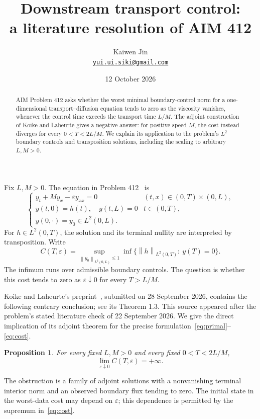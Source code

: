 \documentclass[11pt]{article}
\title{Downstream transport control:\\a literature resolution of AIM 412}
\author{Kaiwen Jin\\\small\href{mailto:yui.ui.siki@gmail.com}{\texttt{yui.ui.siki@gmail.com}}}
\date{12 October 2026}
\newtheorem{proposition}{Proposition}
\newcommand{\norm}[1]{\left\|#1\right\|}
\begin{document}
\maketitle
\begin{abstract}
AIM Problem 412 asks whether the worst minimal boundary-control norm for a
one-dimensional transport--diffusion equation tends to zero as the viscosity
vanishes, whenever the control time exceeds the transport time $L/M$.
The adjoint construction of Koike and Laheurte gives a negative answer:
for positive speed $M$, the cost instead diverges for every $0<T<2L/M$.
We explain its application to the problem's $L^2$ boundary controls and
transposition solutions, including the scaling to arbitrary $L,M>0$.
\end{abstract}

Fix $L,M>0$. The equation in Problem 412~\cite{aim} is
\begin{equation}\label{eq:primal}
\begin{cases}
y_t+My_x-\varepsilon y_{xx}=0 &(t,x)\in(0,T)\times(0,L),\\
y(t,0)=h(t),\quad y(t,L)=0 &t\in(0,T),\\
y(0,\cdot)=y_0\in L^2(0,L).
\end{cases}
\end{equation}
For $h\in L^2(0,T)$, the solution and its terminal nullity are interpreted
by transposition. Write
\begin{equation}\label{eq:cost}
C(T,\varepsilon)
=\sup_{\norm{y_0}_{L^2(0,L)}\leq1}
\inf\bigl\{\norm{h}_{L^2(0,T)}:\ y(T)=0\bigr\}.
\end{equation}
The infimum runs over admissible boundary controls.
The question is whether this cost tends to zero as $\varepsilon\downarrow0$
for every $T>L/M$.

Koike and Laheurte's preprint~\cite{kl}, submitted on 28 September 2026,
contains the following contrary conclusion; see its Theorem 1.3.
This source appeared after the problem's stated literature check of
22 September 2026. We give the direct implication of its adjoint theorem
for the precise formulation~\eqref{eq:primal}--\eqref{eq:cost}.

\begin{proposition}\label{prop:divergence}
For every fixed $L,M>0$ and every fixed $0<T<2L/M$,
\[
\lim_{\varepsilon\downarrow0}C(T,\varepsilon)=+\infty.
\]
\end{proposition}

The obstruction is a family of adjoint solutions with a nonvanishing
terminal interior norm and an observed boundary flux tending to zero.
The initial state in the worst-data cost may depend on $\varepsilon$;
this dependence is permitted by the supremum in~\eqref{eq:cost}.
\end{document}
